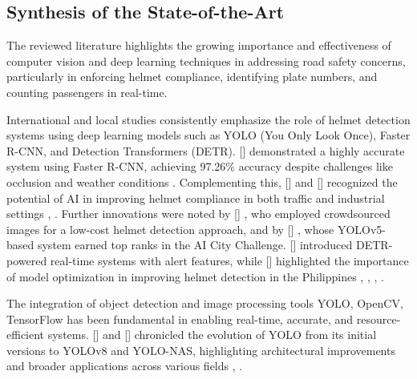 \begin{refsection}
\section{Synthesis of the State-of-the-Art}
    The reviewed literature highlights the growing importance and effectiveness of computer vision and deep learning techniques in addressing road safety concerns, particularly in enforcing helmet compliance, identifying plate numbers, and counting passengers in real-time.

International and local studies consistently emphasize the role of helmet detection systems using deep learning models such as YOLO (You Only Look Once), Faster R-CNN, and Detection Transformers (DETR). \citeauthor{afzal2021helmet} [\citeyear{afzal2021helmet}] demonstrated a highly accurate system using Faster R-CNN, achieving 97.26\% accuracy despite challenges like occlusion and weather conditions \cite{afzal2021helmet}. Complementing this, \citeauthor{singh2024visual} [\citeyear{singh2024visual}] and \citeauthor{giron2020motorcycle} [\citeyear {giron2020motorcycle}] recognized the potential of AI in improving helmet compliance in both traffic and industrial settings \cite{singh2024visual}, \cite{giron2020motorcycle}. Further innovations were noted by \citeauthor{siebert2024urban} [\citeyear{siebert2024urban}] , who employed crowdsourced images for a low-cost helmet detection approach, and by \citeauthor{soltanikazemi2023helmet} [\citeyear{soltanikazemi2023helmet}]  , whose YOLOv5-based system earned top ranks in the AI City Challenge. \citeauthor{mutyala2023helmet} [\citeyear{mutyala2023helmet}] introduced DETR-powered real-time systems with alert features, while \citeauthor{tomas2023motorcycle} [\citeyear{tomas2023motorcycle}] highlighted the importance of model optimization in improving helmet detection in the Philippines \cite{siebert2024urban}, \cite{soltanikazemi2023helmet}, \cite{mutyala2023helmet}, \cite{tomas2023motorcycle}.

The integration of object detection and image processing tools YOLO, OpenCV, TensorFlow has been fundamental in enabling real-time, accurate, and resource-efficient systems. \citeauthor{jiang2022review} [\citeauthor{jiang2022review}] and \citeauthor{terven2022comprehensive} [\citeyear{terven2022comprehensive}] chronicled the evolution of YOLO from its initial versions to YOLOv8 and YOLO-NAS, highlighting architectural improvements and broader applications across various fields \cite{jiang2022review}, \cite{terven2022comprehensive}. 


\end{refsection}

